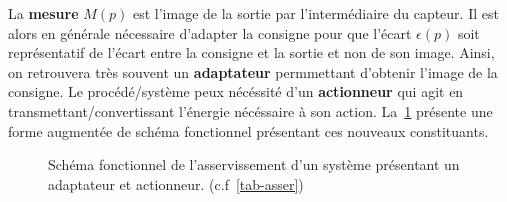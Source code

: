 La \textbf{mesure} $M(p)$ est l'image de la sortie par l'intermédiaire
du capteur. Il est alors en générale nécessaire d'adapter la consigne pour
que l'écart $\epsilon(p)$ soit représentatif de l'écart entre la consigne
et la sortie et non de son image. Ainsi, on retrouvera très souvent 
un \textbf{adaptateur} permmettant d'obtenir l'image de la consigne.
Le procédé/système peux nécéssité d'un \textbf{actionneur} qui agit en 
transmettant/convertissant l'énergie nécéssaire à son action. 
La~\cref{fig-reg2} présente une forme augmentée de schéma fonctionnel
présentant ces nouveaux constituants.


%                                      
%                                      
\begin{figure}[!h]
\centering
{}
\caption{Schéma fonctionnel de l'asservissement d'un système 
         présentant un adaptateur et actionneur. (c.f~\cref{tab-asser})
         \label{fig-reg2}}
\end{figure}

